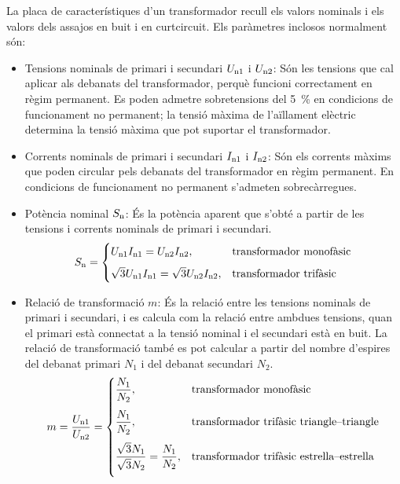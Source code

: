 La  placa de característiques d'un transformador recull els valors nominals  i els valors dels assajos
en buit i en curtcircuit. Els paràmetres inclosos normalment són:
\begin{itemize}
   \item Tensions nominals de primari i secundari  $U_\mathrm{n1}$ i $U_\mathrm{n2}$: Són les tensions que cal aplicar als debanats del transformador, perquè funcioni correctament en règim permanent. Es poden admetre sobretensions del \qty{5}{\percent} en condicions de funcionament no permanent; la tensió màxima de l'aïllament elèctric determina la tensió màxima que pot suportar el transformador.
   \item Corrents nominals de primari i secundari  $I_\mathrm{n1}$ i $I_\mathrm{n2}$: Són els corrents màxims que poden circular pels debanats del transformador en règim permanent. En condicions de funcionament no permanent s'admeten sobrecàrregues.
   \item Potència nominal $S_\mathrm{n}$: És la potència aparent que s'obté a partir de les tensions i corrents nominals de primari i secundari.
       \begin{equation}
        S_\mathrm{n} = \begin{cases} U_\mathrm{n1} I_\mathrm{n1} = U_\mathrm{n2} I_\mathrm{n2}, & \text{transformador monofàsic} \\[2mm]
        \sqrt{3} U_\mathrm{n1} I_\mathrm{n1} = \sqrt{3} U_\mathrm{n2} I_\mathrm{n2}, & \text{transformador trifàsic} \end{cases}
       \end{equation}
   \item Relació de transformació $m$: És la relació entre les tensions nominals de primari i secundari, i es calcula com la relació entre ambdues tensions, quan el primari està connectat a la tensió nominal i el secundari està en buit. La relació de  transformació també es pot calcular a partir del nombre d'espires del debanat primari $N_1$ i del debanat secundari $N_2$.
       \begin{equation}
        m = \frac{U_\mathrm{n1}}{U_\mathrm{n2}} =  \begin{cases}
        \dfrac{N_1}{N_2}, & \text{transformador monofàsic} \\[0.4cm]
        \dfrac{N_1}{N_2}, & \text{transformador trifàsic triangle--triangle} \\[0.4cm]
        \dfrac{\sqrt{3}N_1}{\sqrt{3}N_2} = \dfrac{N_1}{N_2}, & \text{transformador trifàsic estrella--estrella} \\[0.4cm]

\end{cases}
\end{equation}
\end{itemize}
